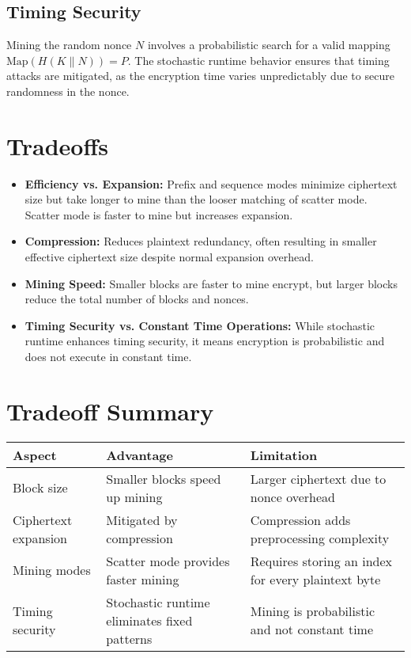 \documentclass[11pt,a4paper]{article}
\begin{document}
\subsection*{Timing Security}
Mining the random nonce \( N \) involves a probabilistic search for a valid mapping \( \text{Map}(H(K \parallel N)) = P \). The stochastic runtime behavior ensures that timing attacks are mitigated, as the encryption time varies unpredictably due to secure randomness in the nonce.

\section*{Tradeoffs}
\begin{itemize}
  \item \textbf{Efficiency vs. Expansion:} Prefix and sequence modes minimize ciphertext size but take longer to mine than the looser matching of scatter mode. Scatter mode is faster to mine but increases expansion.
  \item \textbf{Compression:} Reduces plaintext redundancy, often resulting in smaller effective ciphertext size despite normal expansion overhead.
  \item \textbf{Mining Speed:} Smaller blocks are faster to mine encrypt, but larger blocks reduce the total number of blocks and nonces.
  \item \textbf{Timing Security vs. Constant Time Operations:} While stochastic runtime enhances timing security, it means encryption is probabilistic and does not execute in constant time.
\end{itemize}

\section*{Tradeoff Summary}

\begin{center}
\small
\begin{tabular}{@{}p{2in}p{1.8in}p{2.4in}@{}}
\toprule
\textbf{Aspect}          & \textbf{Advantage}                                 & \textbf{Limitation}                          \\ \midrule
Block size               & Smaller blocks speed up mining                     & Larger ciphertext due to nonce overhead      \\
Ciphertext expansion     & Mitigated by compression                           & Compression adds preprocessing complexity    \\
Mining modes             & Scatter mode provides faster mining               & Requires storing an index for every plaintext byte \\
Timing security          & Stochastic runtime eliminates fixed patterns       & Mining is probabilistic and not constant time \\
\bottomrule
\end{tabular}
\end{center}
\end{document}
